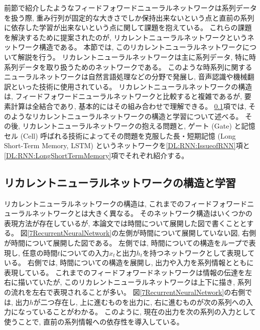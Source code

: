 前節で紹介したようなフィードフォワードニューラルネットワークは系列データを扱う際, 重み行列が固定的な大きさでしか保持出来ないという点と直前の系列に依存した学習が出来ないという点に関して課題を抱えている。
これらの課題を解決するために提案されたのが, リカレントニューラルネットワークというネットワーク構造である。
本節では, このリカレントニューラルネットワークについて解説を行う。
リカレントニューラルネットワークは主に系列データ, 特に時系列データを取り扱うためのネットワークである。
このような時系列に関するニューラルネットワークは自然言語処理などの分野で発展し, 音声認識や機械翻訳といった技術に使用されている。
リカレントニューラルネットワークの構造は, フィードフォワードニューラルネットワークと比較すると複雑であるが, 要素計算は全結合であり, 基本的にはその組み合わせで理解できる。
\ref{DL:RNN:ReccurentNeuralNetwork}項では, そのようなリカレントニューラルネットワークの構造と学習について述べる。
その後, リカレントニューラルネットワークの抱える問題と, ゲート (Gate) と記憶セル (Cell) 呼ばれる技術によってその問題を克服した長・短期記憶 (Long Short-Term Memory, LSTM\cite{LSTMpaper}) というネットワークを\ref{DL:RNN:IssueofRNN}項と\ref{DL:RNN:LongShortTermMemory}項でそれぞれ紹介する。


\subsection{リカレントニューラルネットワークの構造と学習} \label{DL:RNN:ReccurentNeuralNetwork}

リカレントニューラルネットワークの構造は, これまでのフィードフォワードニューラルネットワークとは大きく異なる。
そのネットワーク構造はいくつかの表現方法が存在しているが, 本論文では時間について展開した図で書くこととする。
図\ref{7RecurrentNeuralNetwork}の左側が時間について展開していない図, 右側が時間について展開した図である。
左側では, 時間についての構造をループで表現し, 任意の時間$t$についての入力$x_t$と出力$h_t$を持つネットワークとして表現している。
右側では, 時間についての構造を展開し, 出力や入力を系列情報とともに表現している。
これまでのフィードフォワードネットワークは情報の伝達を左右に描いていたが, このリカレントニューラルネットワークは上下に描き, 系列の流れを左右で表現されることが多い。
図\ref{7RecurrentNeuralNetwork}の右側では, 出力$h$が二つ存在し, 上に進むものを出力に, 右に進むものが次の系列への入力になっていることがわかる。
このように, 現在の出力を次の系列の入力として使うことで, 直前の系列情報への依存性を導入している。

